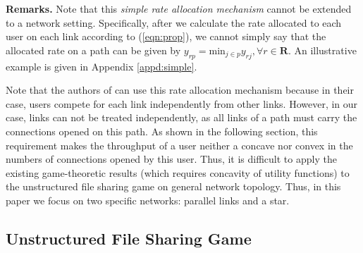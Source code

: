 \documentclass[conference]{IEEEtran}
\begin{document}
\bigskip
\noindent \textbf{Remarks.} Note that this \textit{simple rate
allocation mechanism} cannot be extended to a network setting.
Specifically, after we calculate the rate allocated to each user on
each link according to (\ref{eqn:prop}), we cannot simply say that
the allocated rate on a path can be given by $y_{rp}=
\mbox{min}_{j\in p} y_{rj}, \forall r\in \mathbf{R}.$ An illustrative
example is given in Appendix \ref{appd:simple}.


Note that the authors of \cite{johari04allocation} can use this
rate allocation mechanism because in their case, users compete for
each link independently from other links. However, in our case,
links can not be treated independently, as all links of a path
must carry the connections opened on this path. As shown in the
following section, this requirement makes the throughput of a user
neither a concave nor convex in the numbers of connections opened
by this user.
Thus, it is difficult to apply the existing game-theoretic results
(which requires concavity of utility functions) to the
unstructured file sharing game on general network topology. Thus,
in this paper we focus on two specific networks: parallel links
and a star.


\subsection{Unstructured File Sharing Game}
\end{document}
